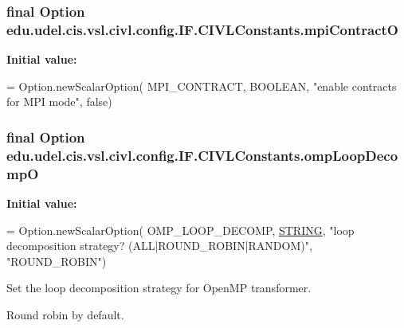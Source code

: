 \subsubsection[{mpi\+Contract\+O}]{\setlength{\rightskip}{0pt plus 5cm}final Option edu.\+udel.\+cis.\+vsl.\+civl.\+config.\+I\+F.\+C\+I\+V\+L\+Constants.\+mpi\+Contract\+O\hspace{0.3cm}{\ttfamily [static]}}\label{classedu_1_1udel_1_1cis_1_1vsl_1_1civl_1_1config_1_1IF_1_1CIVLConstants_acb552806ec46ca230288e1a0288c1673}
{\bfseries Initial value\+:}
\begin{DoxyCode}
= Option.newScalarOption(
            MPI\_CONTRACT, BOOLEAN, \textcolor{stringliteral}{"enable contracts for MPI mode"}, \textcolor{keyword}{false})
\end{DoxyCode}
\hypertarget{classedu_1_1udel_1_1cis_1_1vsl_1_1civl_1_1config_1_1IF_1_1CIVLConstants_a25129abac8ff9753a7a4ab39b19d6ec5}{}
\subsubsection[{omp\+Loop\+Decomp\+O}]{\setlength{\rightskip}{0pt plus 5cm}final Option edu.\+udel.\+cis.\+vsl.\+civl.\+config.\+I\+F.\+C\+I\+V\+L\+Constants.\+omp\+Loop\+Decomp\+O\hspace{0.3cm}{\ttfamily [static]}}\label{classedu_1_1udel_1_1cis_1_1vsl_1_1civl_1_1config_1_1IF_1_1CIVLConstants_a25129abac8ff9753a7a4ab39b19d6ec5}
{\bfseries Initial value\+:}
\begin{DoxyCode}
= Option.newScalarOption(
            OMP\_LOOP\_DECOMP, \hyperlink{struct__STRING}{STRING},
            \textcolor{stringliteral}{"loop decomposition strategy? (ALL|ROUND\_ROBIN|RANDOM)"},
            \textcolor{stringliteral}{"ROUND\_ROBIN"})
\end{DoxyCode}


Set the loop decomposition strategy for Open\+M\+P transformer. 

Round robin by default. \hypertarget{classedu_1_1udel_1_1cis_1_1vsl_1_1civl_1_1config_1_1IF_1_1CIVLConstants_aa9db0fc1c94c2a4620214961cb741586}{}
